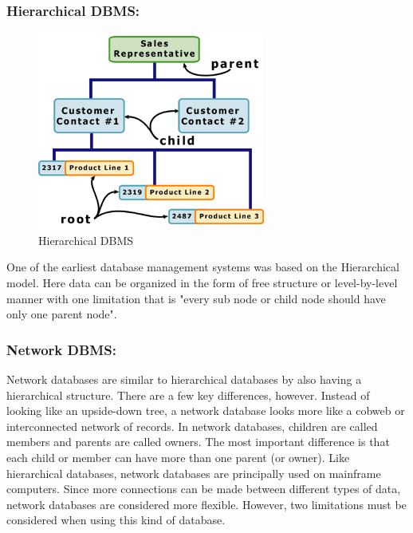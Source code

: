 \documentclass[14pt]{article} %
\begin{document}
\subsubsection{\textbf{Hierarchical DBMS:}}                                
 \begin{figure}[H]
 
  \centerline{\includegraphics[width=0.7\linewidth]{hierarchical.jpg}}
  \caption{Hierarchical DBMS}
  \label{fig:figure 10}
\end{figure}
One of the earliest database management systems was based on the Hierarchical model. Here data can be organized in the form of free structure or level-by-level manner with one limitation that is "every sub node or child node should have only one parent node".

\subsubsection{\textbf{Network DBMS: }}
    Network databases are similar to hierarchical databases by also having a hierarchical structure. There are a few key differences, however. Instead of looking like an upside-down tree, a network database looks more like a cobweb or interconnected network of records. In network databases, children are called members and parents are called owners. The most important difference is that each child or member can have more than one parent (or owner). 
Like hierarchical databases, network databases are principally used on mainframe computers. Since more connections can be made between different types of data, network databases are considered more flexible. However, two limitations must be considered when using this kind of database.
\newpage
\end{document}
